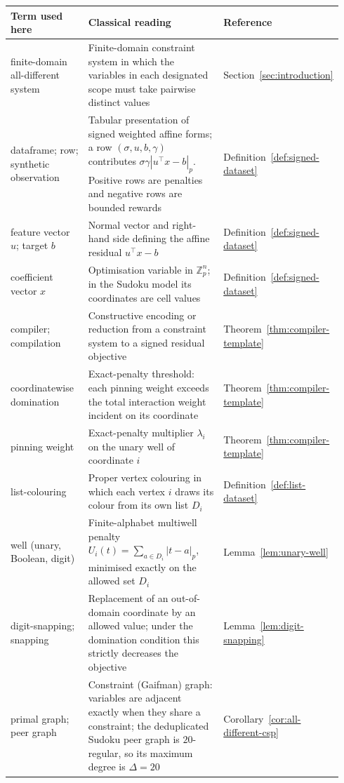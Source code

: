 \documentclass[11pt]{article}
\begin{document}
\begin{table}[t!]
\centering
\footnotesize
\renewcommand{\arraystretch}{0.96}
\begin{tabular}{@{}p{0.27\linewidth}p{0.54\linewidth}p{0.13\linewidth}@{}}
\toprule
Term used here & Classical reading & Reference \\
\midrule
finite-domain all-different system & Finite-domain constraint system in which the variables in each designated scope must take pairwise distinct values & Section~\ref{sec:introduction} \\
dataframe; row; synthetic observation & Tabular presentation of signed weighted affine forms; a row \((\sigma,u,b,\gamma)\) contributes \(\sigma\gamma|u^\top x-b|_p\). Positive rows are penalties and negative rows are bounded rewards & Definition~\ref{def:signed-dataset} \\
feature vector \(u\); target \(b\) & Normal vector and right-hand side defining the affine residual \(u^\top x-b\) & Definition~\ref{def:signed-dataset} \\
coefficient vector \(x\) & Optimisation variable in \(\mathbb Z_p^n\); in the Sudoku model its coordinates are cell values & Definition~\ref{def:signed-dataset} \\
compiler; compilation & Constructive encoding or reduction from a constraint system to a signed residual objective & Theorem~\ref{thm:compiler-template} \\
coordinatewise domination & Exact-penalty threshold: each pinning weight exceeds the total interaction weight incident on its coordinate & Theorem~\ref{thm:compiler-template} \\
pinning weight & Exact-penalty multiplier \(\lambda_i\) on the unary well of coordinate \(i\) & Theorem~\ref{thm:compiler-template} \\
list-colouring & Proper vertex colouring in which each vertex \(i\) draws its colour from its own list \(D_i\) & Definition~\ref{def:list-dataset} \\
well (unary, Boolean, digit) & Finite-alphabet multiwell penalty \(U_i(t)=\sum_{a\in D_i}|t-a|_p\), minimised exactly on the allowed set \(D_i\) & Lemma~\ref{lem:unary-well} \\
digit-snapping; snapping & Replacement of an out-of-domain coordinate by an allowed value; under the domination condition this strictly decreases the objective & Lemma~\ref{lem:digit-snapping} \\
primal graph; peer graph & Constraint (Gaifman) graph: variables are adjacent exactly when they share a constraint; the deduplicated Sudoku peer graph is \(20\)-regular, so its maximum degree is \(\Delta=20\) & Corollary~\ref{cor:all-different-csp} \\

\end{tabular}
\end{table}
\end{document}
